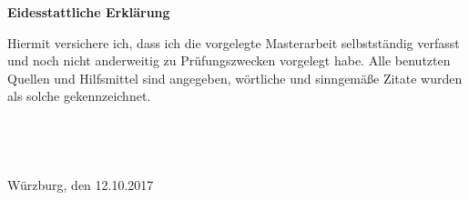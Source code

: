 \thispagestyle{eids}
\begin{center}
 	\Large\textbf{Eidesstattliche Erklärung}\\
\end{center}
Hiermit versichere ich, dass ich die vorgelegte Masterarbeit selbstständig verfasst und noch nicht
anderweitig zu Prüfungszwecken vorgelegt habe. Alle benutzten Quellen und Hilfsmittel sind
angegeben, wörtliche und sinngemäße Zitate wurden als solche gekennzeichnet.\\\\\\\\\\
Würzburg, den 12.10.2017

\newpage